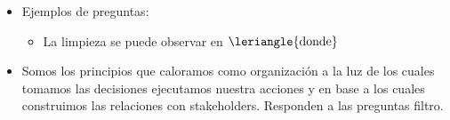 \begin{enumerate}
\begin{itemize}
            \item Ejemplos de preguntas:
                \begin{itemize}
                    \item La limpieza se puede observar en $\leriangle{\text{donde}}$ 
                \end{itemize}
            
            \item Somos los principios que caloramos como organización a la luz de los cuales tomamos las decisiones ejecutamos nuestra acciones y en base a los cuales construimos las relaciones con stakeholders. Responden a las preguntas filtro.
        \end{itemize}
\end{enumerate}

